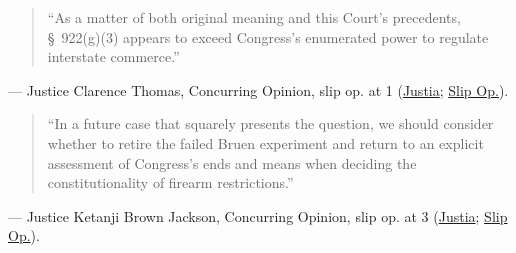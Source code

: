 \documentclass[12pt]{article}
\begin{document}
\begin{quote}
``As a matter of both original meaning and this Court's precedents, \S~922(g)(3) appears to exceed Congress's enumerated power to regulate interstate commerce.''
\end{quote}
\noindent --- Justice Clarence Thomas, Concurring Opinion, slip op. at 1 (\href{https://supreme.justia.com/cases/federal/us/608/24-1234/}{Justia}; \href{https://www.supremecourt.gov/opinions/25pdf/24-1234_g2bh.pdf}{Slip Op.}).

\begin{quote}
``In a future case that squarely presents the question, we should consider whether to retire the failed Bruen experiment and return to an explicit assessment of Congress's ends and means when deciding the constitutionality of firearm restrictions.''
\end{quote}
\noindent --- Justice Ketanji Brown Jackson, Concurring Opinion, slip op. at 3 (\href{https://supreme.justia.com/cases/federal/us/608/24-1234/}{Justia}; \href{https://www.supremecourt.gov/opinions/25pdf/24-1234_g2bh.pdf}{Slip Op.}).
\end{document}
